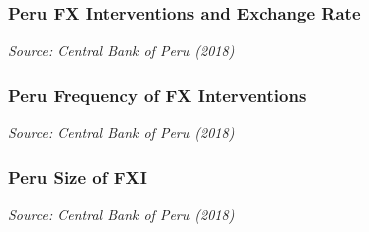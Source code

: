 \documentclass{beamer}
\begin{document}
\begin{frame}
\frametitle{Peru FX Interventions and Exchange Rate}
\medskip
\emph{Source: Central Bank of Peru (2018)}
\end{frame}


\begin{frame}
\frametitle{Peru Frequency of FX Interventions}
\medskip
\emph{Source: Central Bank of Peru (2018)}
\end{frame}


\begin{frame}
\frametitle{Peru Size of FXI}
\medskip
\emph{Source: Central Bank of Peru (2018)}
\end{frame}
\end{document}
